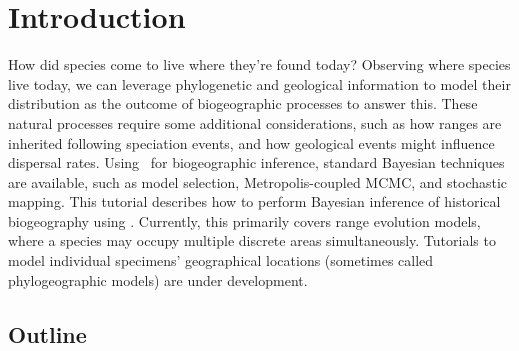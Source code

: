 \section{Introduction}

How did species come to live where they're found today?
Observing where species live today, we can leverage phylogenetic and geological information to model their distribution as the outcome of biogeographic processes to answer this.
These natural processes require some additional considerations, such as how ranges are inherited following speciation events, and how geological events might influence dispersal rates.
Using \Revbayes~for biogeographic inference, standard Bayesian techniques are available, such as model selection, Metropolis-coupled MCMC, and stochastic mapping.
This tutorial describes how to perform Bayesian inference of historical biogeography using \RevBayes. 
Currently, this primarily covers range evolution models, where a species may occupy multiple discrete areas simultaneously.
Tutorials to model individual specimens' geographical locations (sometimes called phylogeographic models) are under development.

\subsection*{\textbf{Outline}}

%
%
%
%
%
%
%
%
%
%

%

%

